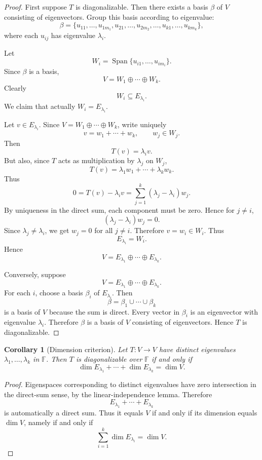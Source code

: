 \documentclass[11pt]{article}
\newcommand{\F}{\mathbb F}
\newcommand{\Span}{\operatorname{Span}}
\theoremstyle{definition}
\theoremstyle{plain}
\newtheorem{corollary}[definition]{Corollary}
\begin{document}
\begin{proof}
First suppose $T$ is diagonalizable.  Then there exists a basis $\beta$ of $V$ consisting of eigenvectors.  Group this basis according to eigenvalue:
\[
\beta=
\{u_{11},\dots,u_{1m_1},
 u_{21},\dots,u_{2m_2},
 \dots,
 u_{k1},\dots,u_{km_k}\},
\]
where each $u_{ij}$ has eigenvalue $\lambda_i$.

Let
\[
W_i=\Span\{u_{i1},\dots,u_{im_i}\}.
\]
Since $\beta$ is a basis,
\[
V=W_1\oplus\cdots\oplus W_k.
\]
Clearly
\[
W_i\subseteq E_{\lambda_i}.
\]
We claim that actually $W_i=E_{\lambda_i}$.

Let $v\in E_{\lambda_i}$.  Since $V=W_1\oplus\cdots\oplus W_k$, write uniquely
\[
v=w_1+\cdots+w_k,
\qquad
w_j\in W_j.
\]
Then
\[
T(v)=\lambda_i v.
\]
But also, since $T$ acts as multiplication by $\lambda_j$ on $W_j$,
\[
T(v)=\lambda_1w_1+\cdots+\lambda_kw_k.
\]
Thus
\[
0=T(v)-\lambda_i v
=\sum_{j=1}^k(\lambda_j-\lambda_i)w_j.
\]
By uniqueness in the direct sum, each component must be zero.  Hence for $j\neq i$,
\[
(\lambda_j-\lambda_i)w_j=0.
\]
Since $\lambda_j\neq\lambda_i$, we get $w_j=0$ for all $j\neq i$.  Therefore $v=w_i\in W_i$.  Thus
\[
E_{\lambda_i}=W_i.
\]
Hence
\[
V=E_{\lambda_1}\oplus\cdots\oplus E_{\lambda_k}.
\]

Conversely, suppose
\[
V=E_{\lambda_1}\oplus\cdots\oplus E_{\lambda_k}.
\]
For each $i$, choose a basis $\beta_i$ of $E_{\lambda_i}$.  Then
\[
\beta=\beta_1\cup\cdots\cup\beta_k
\]
is a basis of $V$ because the sum is direct.  Every vector in $\beta_i$ is an eigenvector with eigenvalue $\lambda_i$.  Therefore $\beta$ is a basis of $V$ consisting of eigenvectors.  Hence $T$ is diagonalizable.
\end{proof}

\begin{corollary}[Dimension criterion]
Let $T:V\to V$ have distinct eigenvalues $\lambda_1,\dots,\lambda_k$ in $\F$.  Then $T$ is diagonalizable over $\F$ if and only if
\[
\dim E_{\lambda_1}+\cdots+\dim E_{\lambda_k}=\dim V.
\]
\end{corollary}

\begin{proof}
Eigenspaces corresponding to distinct eigenvalues have zero intersection in the direct-sum sense, by the linear-independence lemma.  Therefore
\[
E_{\lambda_1}+\cdots+E_{\lambda_k}
\]
is automatically a direct sum.  Thus it equals $V$ if and only if its dimension equals $\dim V$, namely if and only if
\[
\sum_{i=1}^k\dim E_{\lambda_i}=\dim V.
\]
\end{proof}
\end{document}
